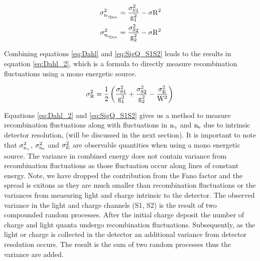 \begin{equation}
\begin{split}
\rm  \sigma_{n_{\gamma_{Det}}}^2 = \frac{\sigma_{S1}^2}{g_1^2} - \sigma{R^2}\\
\rm \sigma_{n_{e_{Det}}}^2 = \frac{\sigma_{S2}^2}{g_2^2} - \sigma{R^2}
\label{eq:SigQ_S1S2}
\end{split}
\end{equation}

Combining equations \ref{eq:Dahl} and \ref{eq:SigQ_S1S2} leads to the results in equation \ref{eq:Dahl_2}, which is a formula to directly measure recombination fluctuations using a mono energetic source.

\begin{equation}
\rm \sigma_{R}^2  = \frac{1}{2}\left( \frac{\sigma_{S1}^2}{g_1^2} + \frac{\sigma_{S2}^2}{g_2^2} - \frac{\sigma_E^2}{W^2}\right)\\
\label{eq:Dahl_2}
\end{equation}

Equations \ref{eq:Dahl_2} and \ref{eq:SigQ_S1S2} gives us a method to measure recombination fluctuations along with fluctuations in $\rm n_\gamma$ and $\rm n_e$ due to intrinsic detector resolution, (will be discussed in the next section). It is important to note that $\rm \sigma_{n_\gamma}^2$, $\rm \sigma_{n_e}^2$ and $\rm \sigma_{E}^2 $ are observable quantities when using a mono energetic source. The variance in combined energy does not contain variance from recombination fluctuations as those fluctuation occur along lines of constant energy. Note, we have dropped the contribution from the Fano factor and the spread is exitons as they are much smaller than recombination fluctuations or the variances from measuring light and charge intrinsic to the detector. The observed variance in the light and charge channels (S1, S2) is the result of two compounded random processes. After the initial charge deposit the number of charge and light quanta undergo recombination fluctuations. Subsequently, as the light or charge is collected in the detector an additional variance from detector resolution occurs. The result is the sum of two random processes thus the variance are added.




